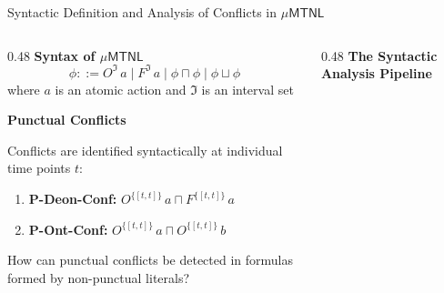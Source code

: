 \documentclass[9pt,aspectratio=169]{beamer}
\newcommand{\logic}[1]{\ensuremath{\mathsf{#1}}\xspace}
\newcommand{\TDDLfm}{\logic{\mu MTNL}}
\newcommand{\is}{\ensuremath{\mathfrak{I}}}
\newcommand{\dpnf}{\ensuremath{\mathsf{DPNF}}}
\newcommand{\pnf}{\ensuremath{\mathsf{PNF}}}
\newcommand{\ob}[2]{\ensuremath{O^{#1}\,#2}}
\newcommand{\forbb}[2]{\ensuremath{F^{#1}\,#2}}
\begin{document}
\begin{frame}{Syntactic Definition and Analysis of Conflicts in $\TDDLfm$ }
\small
\begin{columns}[T]
\begin{column}{0.48\textwidth}
  \textbf{Syntax of $\TDDLfm$}
  \[ \phi ::= \ob{\is}{a} \mid \forbb{\is}{a} \mid \phi \sqcap \phi \mid \phi \sqcup \phi \]
  \vspace{-2mm}
 where $a $ is an atomic action and  $\is$ is an interval set

  \vspace{4mm}
  \small
  \textbf{Punctual Conflicts}
  \medskip

  Conflicts are identified syntactically at individual time points $t$:
  \begin{enumerate}
    \item \textbf{P-Deon-Conf:}
    $ \ob{\{[t,t]\}}{a} \sqcap \forbb{\{[t,t]\}}{a} $
    \item \textbf{P-Ont-Conf:}
    $ \ob{\{[t,t]\}}{a} \sqcap \ob{\{[t,t]\}}{b} $
  \end{enumerate}
  \vspace{2mm}
  \vspace{1mm}
  How can punctual conflicts be detected in formulas formed by non-punctual literals?
\end{column}

\begin{column}{0.48\textwidth}
  \textbf{The Syntactic Analysis Pipeline}
  
  \vspace{2mm}
  \begin{center}
\end{center}
\end{column}
\end{columns}
\end{frame}
\end{document}
